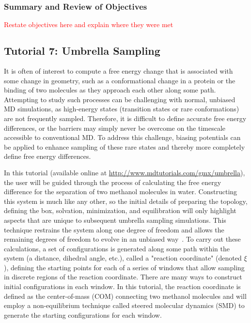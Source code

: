 \documentclass[9pt,tutorial,pubversion]{livecoms}
\newcommand{\urlstring}{http://www.mdtutorials.com/gmx}
\newcommand{\tutorialpmf}{\url{\urlstring/umbrella}}
\begin{document}
\subsubsection{Summary and Review of Objectives} \label{dgbind_summary}

\textcolor{red}{Restate objectives here and explain where they were met}

\subsection{Tutorial 7: Umbrella Sampling} \label{pmf}



It is often of interest to compute a free energy change that is associated with some change in geometry, such as a conformational change in a protein or the binding of two molecules as they approach each other along some path. Attempting to study such processes can be challenging with normal, unbiased MD simulations, as high-energy states (transition states or rare conformations) are not frequently sampled. Therefore, it is difficult to define accurate free energy differences, or the barriers may simply never be overcome on the timescale accessible to conventional MD. To address this challenge, biasing potentials can be applied to enhance sampling of these rare states and thereby more completely define free energy differences.

In this tutorial (available online at \tutorialpmf), the user will be guided through the process of calculating the free energy difference for the separation of two methanol molecules in water. Constructing this system is much like any other, so the initial details of preparing the topology, defining the box, solvation, minimization, and equilibration will only highlight aspects that are unique to subsequent umbrella sampling simulations. This technique restrains the system along one degree of freedom and allows the remaining degrees of freedom to evolve in an unbiased way~\cite{Torrie1977}. To carry out these calculations, a set of configurations is generated along some path within the system (a distance, dihedral angle, etc.), called a "reaction coordinate" (denoted $\xi$), defining the starting points for each of a series of windows that allow sampling in discrete regions of the reaction coordinate. There are many ways to construct initial configurations in each window. In this tutorial, the reaction coordinate is defined as the center-of-mass (COM) connecting two methanol molecules and will employ a non-equilibrium technique called steered molecular dynamics (SMD) to generate the starting configurations for each window.
\end{document}
